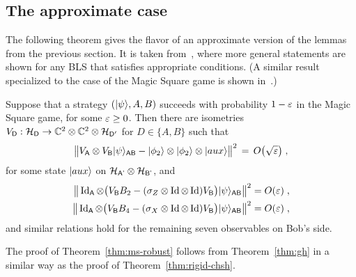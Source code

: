 \subsection{The approximate case}

The following theorem gives the flavor of an approximate version of the lemmas from the previous section. It is taken from~\cite{coladangelo2017robust}, where more general statements are shown for any BLS that satisfies appropriate conditions. (A similar result specialized to the case of the Magic Square game is shown in~\cite{wu2016device}.)

\begin{theorem}\label{thm:ms-robust}
Suppose that a strategy $(|\psi\rangle,A,B)$ succeeds with probability $1-\varepsilon$ in the Magic Square game, for some $\varepsilon\geq 0$. Then there are isometries $V_{\textsf{D}}:\mathcal{H}_{\textsf{D}}\to \mathbb{C}^2 \otimes \mathbb{C}^2 \otimes \mathcal{H}_{{\textsf{D}}'}$ for $D\in\{A,B\}$ such that
\[ \big\| V_{\textsf{A}} \otimes V_{{\textsf{B}}} |\psi\rangle_{{\textsf{AB}}} - |\phi_2\rangle\otimes |\phi_2\rangle \otimes |aux\rangle \big\|^2 \,=\, O\big(\sqrt{\varepsilon}\big)\;,\]
for some state $|aux\rangle$ on $\mathcal{H}_{{\textsf{A'}}}\otimes \mathcal{H}_{{\textsf{B'}}}$, and
\begin{align} 
\big\| \mathop{\rm Id}\nolimits_{\textsf{A}} \otimes \big( V_{\textsf{B}} B_2 -  (\sigma_Z\otimes \mathop{\rm Id}\nolimits \otimes \mathop{\rm Id}\nolimits) V_{\textsf{B}}\big)|\psi\rangle_{{\textsf{AB}}}\big\|^2 &= O(\varepsilon)\;,\label{eq:ms-z}\\
\big\| \mathop{\rm Id}\nolimits_{\textsf{A}} \otimes \big( V_{\textsf{B}} B_4 -  (\sigma_X\otimes \mathop{\rm Id}\nolimits \otimes \mathop{\rm Id}\nolimits) V_{\textsf{B}}\big)|\psi\rangle_{{\textsf{AB}}}\big\|^2 &= O(\varepsilon)\;,\label{ea:ms-x}
\end{align}
and similar relations hold for the remaining seven observables on Bob's side. 
\end{theorem}

The proof of Theorem~\ref{thm:ms-robust} follows from Theorem~\ref{thm:gh} in a similar way as the proof of Theorem~\ref{thm:rigid-chsh}.

